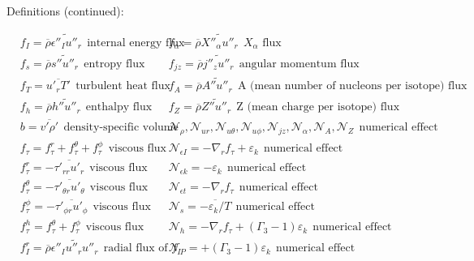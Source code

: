 \documentclass[10pt,paper=a4]{report}
\newcommand{\eht}{\overline}
\newcommand{\fht}{\widetilde}
\begin{document}
\begin{table*}
\label{tab:rans-cont}
\caption{Definitions (continued):}
\begin{align}
& f_I = \eht{\rho} \fht{\epsilon''_I u''_r} \ \ \mbox{internal energy flux}        & & f_\alpha = \eht{\rho} \fht{X''_\alpha u''_r} \ \ \mbox{$X_\alpha$ flux}                   \nonumber \\        
& f_s = \eht{\rho} \fht{s'' u''_r} \ \ \mbox{entropy flux}                & & f_{jz} = \eht{\rho}\fht{j''_z u''_r} \ \ \mbox{angular momentum flux}    \nonumber \\ 
& f_T = \eht{u'_r T'} \ \ \mbox{turbulent heat flux}                      & & f_A = \eht{\rho}\fht{A''u''_r} \ \ \mbox{A (mean number of nucleons per isotope) flux}  \nonumber \\
& f_h = \eht{\rho}\fht{h''u''_r} \ \ \mbox{enthalpy flux}        & &  f_Z = \eht{\rho}\fht{Z''u''_r} \ \ \mbox{Z (mean charge per isotope) flux}  \nonumber \\         
& b = \overline{v'\rho'} \ \ \mbox{density-specific volume covariance}                & & \mathcal N_\rho, \mathcal N_{ur}, \mathcal N_{u\theta}, \mathcal N_{u\phi}, \mathcal N_{jz}, \mathcal N_{\alpha}, \mathcal N_{A}, \mathcal N_{Z} \ \ \mbox{numerical effect} \nonumber \\              
& f_\tau = f_\tau^r + f_\tau^\theta + f_\tau^\phi \ \ \mbox{viscous flux}                    & &  \mathcal N_{\epsilon I} = -\nabla_r f_\tau +\varepsilon_k \ \ \mbox{numerical effect} \nonumber \\ 
& f_\tau^r = -\eht{\tau'_{rr}u'_r}  \ \ \mbox{viscous flux}                               & &  \mathcal N_{\epsilon k} = -\varepsilon_k \ \ \mbox{numerical effect} \nonumber \\              
& f_\tau^\theta = -\eht{\tau'_{\theta r} u'_\theta }  \ \ \mbox{viscous flux}                 & &  \mathcal N_{\epsilon t} = -\nabla_r f_\tau \ \ \mbox{numerical effect} \nonumber \\  
& f_\tau^\phi = -\eht{\tau'_{\phi r} u'_\phi}  \ \ \mbox{viscous flux}                       & &   \mathcal N_{s} = \eht{-\varepsilon_k/T} \ \ \mbox{numerical effect} \nonumber \\          
& f_\tau^h = f_\tau^\theta + f_\tau^\phi   \ \ \mbox{viscous flux}                           & & \mathcal N_{h} = -\nabla_r f_\tau + (\Gamma_3 -1)\varepsilon_k \ \ \mbox{numerical effect} \nonumber \\              
& f_I^r = \eht{\rho}\fht{\epsilon''_I u''_r u''_r} \ \ \mbox{radial flux of $f_I$}      & &  \mathcal N_{P} = +(\Gamma_3 -1)\varepsilon_k \ \ \mbox{numerical effect} \nonumber \\

\end{align}
\end{table*}
\end{document}
